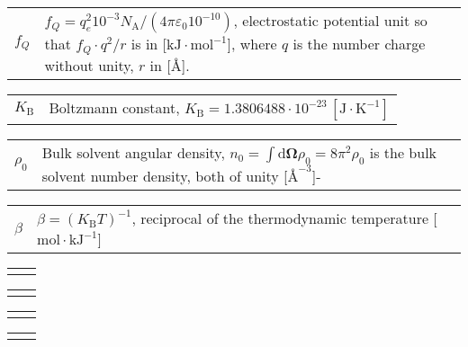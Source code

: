 \hspace{-1.5em}%
\begin{tabular}{>{\raggedright}p{3.3em}>{\raggedright}p{}}
$f_{Q}$ & $f_{Q}=q_{e}^{2}10^{-3}N_{\mathrm{A}}/(4\pi\varepsilon_{0}10^{-10})$,
electrostatic potential unit so that $f_{Q}\cdot q^{2}/r$ is in {[}$\mathrm{kJ\cdot mol^{-1}}${]},
where $q$ is the number charge without unity, $r$ in {[}$\textrm{\AA}${]}.\tabularnewline
\end{tabular}

\hspace{-1.5em}%
\begin{tabular}{>{\raggedright}p{3.3em}l}
$K_{\mathrm{B}}$ & Boltzmann constant, $K_{\mathrm{B}}=1.3806488\cdot10^{-23}\,[\mathrm{J\cdot K^{-1}}]$\tabularnewline
\end{tabular}

\hspace{-1.5em}%
\begin{tabular}{>{\raggedright}p{3.3em}>{\raggedright}p{}}
$\rho_{0}$ & Bulk solvent angular density, $n_{0}=\int\mathrm{d}\mathbf{\Omega}\rho_{\text{0}}=8\pi^{2}\rho_{0}$
is the bulk solvent number density, both of unity {[}$\mathrm{\textrm{\AA}^{-3}}${]}-\tabularnewline
\end{tabular}

\hspace{-1.5em}%
\begin{tabular}{>{\raggedright}p{3.3em}l}
$\beta$ & $\beta=\left(K_{\mathrm{B}}T\right)^{-1}$, reciprocal of the thermodynamic
temperature {[}$\mathrm{mol\cdot kJ^{-1}}${]}\tabularnewline
\end{tabular}

\hspace{-1.5em}%
\begin{tabular}{>{\raggedright}p{3.3em}l}
$ $ & \tabularnewline
\end{tabular}

\hspace{-1.5em}%
\begin{tabular}{>{\raggedright}p{3.3em}l}
$ $ & \tabularnewline
\end{tabular}

\hspace{-1.5em}%
\begin{tabular}{>{\raggedright}p{3.3em}l}
$ $ & \tabularnewline
\end{tabular}

\hspace{-1.5em}%
\begin{tabular}{>{\raggedright}p{3.3em}l}
$ $ & \tabularnewline
\end{tabular}

